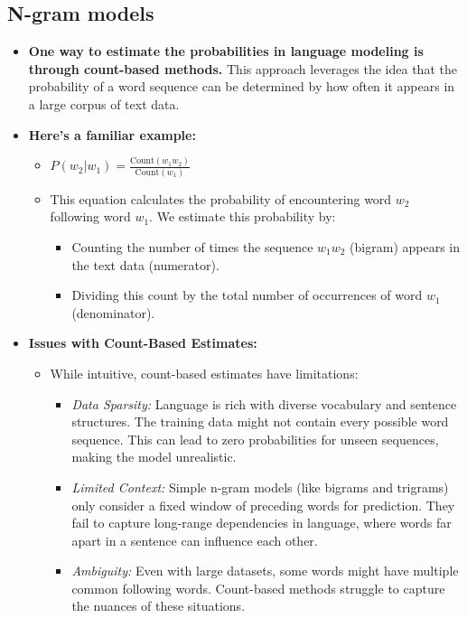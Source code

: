 \documentclass[12pt]{article}
\begin{document}
    \subsection{N-gram models}
        \begin{itemize}
            \item \textbf{One way to estimate the probabilities in language modeling is through count-based methods.} This approach leverages the idea that the probability of a word sequence can be determined by how often it appears in a large corpus of text data.
            \item \textbf{Here's a familiar example:}
            \begin{itemize}
                \item $P(w_2 | w_1) = \frac{\text{Count}(w_1w_2)}{\text{Count}(w_1)}$
                \item This equation calculates the probability of encountering word $w_2$ following word $w_1$. We estimate this probability by:
                \begin{itemize}
                    \item Counting the number of times the sequence $w_1w_2$ (bigram) appears in the text data (numerator).
                    \item Dividing this count by the total number of occurrences of word $w_1$ (denominator).
                \end{itemize}
            \end{itemize}
            \item \textbf{Issues with Count-Based Estimates:}
            \begin{itemize}
                \item While intuitive, count-based estimates have limitations:
                \begin{itemize}
                    \item \textit{Data Sparsity:} Language is rich with diverse vocabulary and sentence structures. The training data might not contain every possible word sequence. This can lead to zero probabilities for unseen sequences, making the model unrealistic.
                    \item \textit{Limited Context:} Simple n-gram models (like bigrams and trigrams) only consider a fixed window of preceding words for prediction. They fail to capture long-range dependencies in language, where words far apart in a sentence can influence each other.
                    \item \textit{Ambiguity:} Even with large datasets, some words might have multiple common following words. Count-based methods struggle to capture the nuances of these situations.
                \end{itemize}
            \end{itemize}
        \end{itemize}
\end{document}
